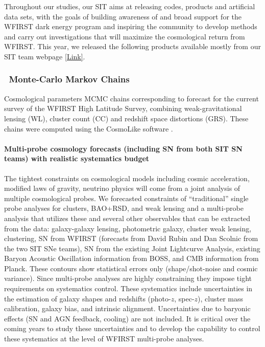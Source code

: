 Throughout our studies, our SIT aims at releasing codes, products and artificial data sets, with the goals of building awareness of and broad support for the WFIRST dark energy program and inspiring the community to develop methods and carry out investigations that will maximize the cosmological return from WFIRST. This year, we released the following products available mostly from our SIT team webpage \href{http://www.wfirst-hls-cosmology.org/products/}{[Link]}.

\subsubsection{\CoLi\ Monte-Carlo Markov Chains}

Cosmological parameters MCMC chains corresponding to forecast for the current survey of the WFIRST High Latitude Survey, combining weak-gravitational lensing (WL), cluster count (CC) and redshift space distortions (GRS). These chains were computed using the CosmoLike software \citep{Krause2016}.

\paragraph{Multi-probe cosmology forecasts (including SN from both SIT SN teams) with realistic systematics budget} The tightest constraints on cosmological models including cosmic acceleration, modified laws of gravity, neutrino physics will come from a joint analysis of multiple cosmological probes. We forecasted constraints of “traditional” single probe analyses for clusters, BAO+RSD, and weak lensing and a multi-probe analysis that utilizes these and several other observables that can be extracted from the data: galaxy-galaxy lensing, photometric galaxy, cluster weak lensing, clustering, SN from WFIRST (forecasts from David Rubin and Dan Scolnic from the two SIT SNe teams), SN from the existing Joint Lightcurve Analysis, existing Baryon Acoustic Oscillation information from BOSS, and CMB information from Planck. These contours show statistical errors only (shape/shot-noise and cosmic variance). Since multi-probe analyses are highly constraining they impose tight requirements on systematics control. These systematics include uncertainties in the estimation of galaxy shapes and redshifts (photo-$z$, spec-$z$), cluster mass calibration, galaxy bias, and intrinsic alignment. Uncertainties due to baryonic effects (SN and AGN feedback, cooling) are not included. It is critical over the coming years to study these uncertainties and to develop the capability to control these systematics at the level of WFIRST multi-probe analyses.

